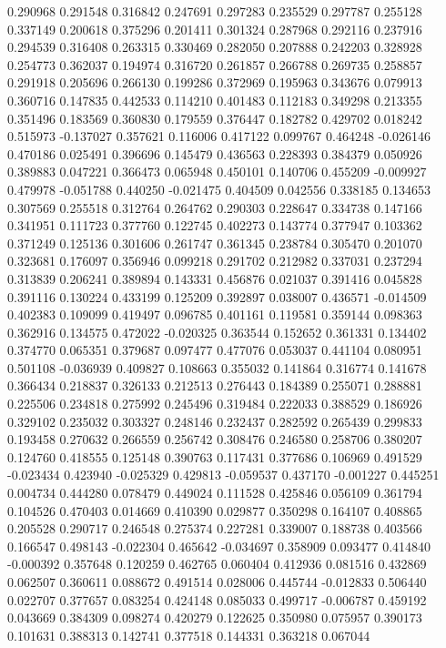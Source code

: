 0.290968
0.291548
0.316842
0.247691
0.297283
0.235529
0.297787
0.255128
0.337149
0.200618
0.375296
0.201411
0.301324
0.287968
0.292116
0.237916
0.294539
0.316408
0.263315
0.330469
0.282050
0.207888
0.242203
0.328928
0.254773
0.362037
0.194974
0.316720
0.261857
0.266788
0.269735
0.258857
0.291918
0.205696
0.266130
0.199286
0.372969
0.195963
0.343676
0.079913
0.360716
0.147835
0.442533
0.114210
0.401483
0.112183
0.349298
0.213355
0.351496
0.183569
0.360830
0.179559
0.376447
0.182782
0.429702
0.018242
0.515973
-0.137027
0.357621
0.116006
0.417122
0.099767
0.464248
-0.026146
0.470186
0.025491
0.396696
0.145479
0.436563
0.228393
0.384379
0.050926
0.389883
0.047221
0.366473
0.065948
0.450101
0.140706
0.455209
-0.009927
0.479978
-0.051788
0.440250
-0.021475
0.404509
0.042556
0.338185
0.134653
0.307569
0.255518
0.312764
0.264762
0.290303
0.228647
0.334738
0.147166
0.341951
0.111723
0.377760
0.122745
0.402273
0.143774
0.377947
0.103362
0.371249
0.125136
0.301606
0.261747
0.361345
0.238784
0.305470
0.201070
0.323681
0.176097
0.356946
0.099218
0.291702
0.212982
0.337031
0.237294
0.313839
0.206241
0.389894
0.143331
0.456876
0.021037
0.391416
0.045828
0.391116
0.130224
0.433199
0.125209
0.392897
0.038007
0.436571
-0.014509
0.402383
0.109099
0.419497
0.096785
0.401161
0.119581
0.359144
0.098363
0.362916
0.134575
0.472022
-0.020325
0.363544
0.152652
0.361331
0.134402
0.374770
0.065351
0.379687
0.097477
0.477076
0.053037
0.441104
0.080951
0.501108
-0.036939
0.409827
0.108663
0.355032
0.141864
0.316774
0.141678
0.366434
0.218837
0.326133
0.212513
0.276443
0.184389
0.255071
0.288881
0.225506
0.234818
0.275992
0.245496
0.319484
0.222033
0.388529
0.186926
0.329102
0.235032
0.303327
0.248146
0.232437
0.282592
0.265439
0.299833
0.193458
0.270632
0.266559
0.256742
0.308476
0.246580
0.258706
0.380207
0.124760
0.418555
0.125148
0.390763
0.117431
0.377686
0.106969
0.491529
-0.023434
0.423940
-0.025329
0.429813
-0.059537
0.437170
-0.001227
0.445251
0.004734
0.444280
0.078479
0.449024
0.111528
0.425846
0.056109
0.361794
0.104526
0.470403
0.014669
0.410390
0.029877
0.350298
0.164107
0.408865
0.205528
0.290717
0.246548
0.275374
0.227281
0.339007
0.188738
0.403566
0.166547
0.498143
-0.022304
0.465642
-0.034697
0.358909
0.093477
0.414840
-0.000392
0.357648
0.120259
0.462765
0.060404
0.412936
0.081516
0.432869
0.062507
0.360611
0.088672
0.491514
0.028006
0.445744
-0.012833
0.506440
0.022707
0.377657
0.083254
0.424148
0.085033
0.499717
-0.006787
0.459192
0.043669
0.384309
0.098274
0.420279
0.122625
0.350980
0.075957
0.390173
0.101631
0.388313
0.142741
0.377518
0.144331
0.363218
0.067044
